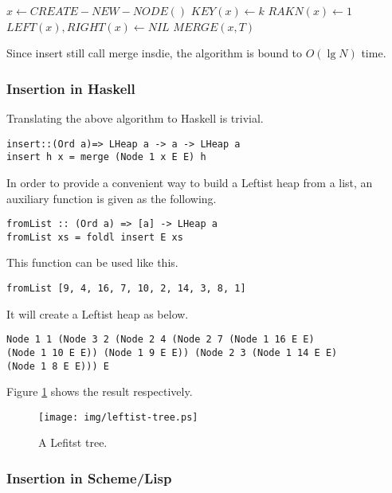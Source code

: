 \documentclass{article}
\begin{document}
\begin{algorithmic}[1]
  \State $x \gets CREATE-NEW-NODE()$
  \State $KEY(x) \gets k$
  \State $RAKN(x) \gets 1$
  \State $LEFT(x), RIGHT(x) \gets NIL$
  \State \Return $MERGE(x, T)$
\EndFunction
\end{algorithmic}

Since insert still call merge insdie, the algorithm is bound to $O(\lg N)$
time.

\subsubsection*{Insertion in Haskell}

Translating the above algorithm to Haskell is trivial.

\lstset{language=Haskell}
\begin{lstlisting}
insert::(Ord a)=> LHeap a -> a -> LHeap a
insert h x = merge (Node 1 x E E) h
\end{lstlisting}

In order to provide a convenient way to build a Leftist heap from
a list, an auxiliary function is given as the following.

\begin{lstlisting}
fromList :: (Ord a) => [a] -> LHeap a
fromList xs = foldl insert E xs
\end{lstlisting}

This function can be used like this.

\begin{lstlisting}
fromList [9, 4, 16, 7, 10, 2, 14, 3, 8, 1]
\end{lstlisting}

It will create a Leftist heap as below.

\begin{verbatim}
Node 1 1 (Node 3 2 (Node 2 4 (Node 2 7 (Node 1 16 E E) 
(Node 1 10 E E)) (Node 1 9 E E)) (Node 2 3 (Node 1 14 E E) 
(Node 1 8 E E))) E
\end{verbatim}

Figure \ref{fig:leftist-tree} shows the result respectively.

\begin{figure}[htbp]
   \begin{center}
   	  \texttt{[image: img/leftist-tree.ps]}
    \caption{A Lefitst tree.} \label{fig:leftist-tree}
   \end{center}
\end{figure}

\subsubsection*{Insertion in Scheme/Lisp}
\end{document}
